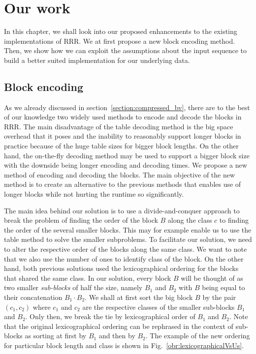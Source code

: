 \chapter{Our work}
\label{kap:kap3}

In this chapter, we shall look into our proposed enhancements to the existing
implementations of RRR. We at first propose a new block encoding method.
Then, we show how we can exploit the assumptions about the input sequence to
build a better suited implementation for our underlying data. 

\section{Block encoding}

As we already discussed in section~\ref{section:compressed_bv}, there are to
the best of our knowledge two widely used methods to encode and decode the
blocks in RRR. The main disadvantage of the table decoding method is the big space
overhead that it poses and the inability to reasonably support longer blocks
in practice because of the huge table sizes for bigger block lengths. On the
other hand, the on-the-fly decoding method may be used to support a bigger block size
with the downside being longer encoding and decoding times. We propose a
new method of encoding and decoding the blocks. The main objective of the new method is
to create an alternative to the previous methods that enables use of longer blocks
while not hurting the runtime so significantly.

The main idea behind our solution is to use a divide-and-conquer approach to break
the problem of finding the order of the block $B$ along the class $c$ to finding the order
of the several smaller blocks. This may for example enable us to use the table method to solve the
smaller subproblems. To facilitate our solution, we need to alter the respective order of
the blocks along the same class. We want to note that we also use the number of ones to
identify class of the block. On the other hand, both previous solutions used the lexicographical ordering
for the blocks that shared the same class. In our solution, every block $B$ will be thought
of as two smaller \textit{sub-blocks} of half the size, namely $B_1$ and $B_2$ with $B$ being equal to their
concatenation $B_1\cdot B_2$. We shall at first sort the big block $B$ by the pair $(c_1, c_2)$
where $c_1$ and $c_2$ are the respective classes of the smaller sub-blocks $B_1$ and $B_2$. Only then,
we break the tie by lexicographical order of $B_1$ and $B_2$. Note that the original lexicographical
ordering can be rephrased in the context of sub-blocks as sorting at first by $B_1$ and then by
$B_2$. The example of the new ordering for particular block length and class is shown in
Fig.~\ref{obr:lexicographicalVsUs}.

